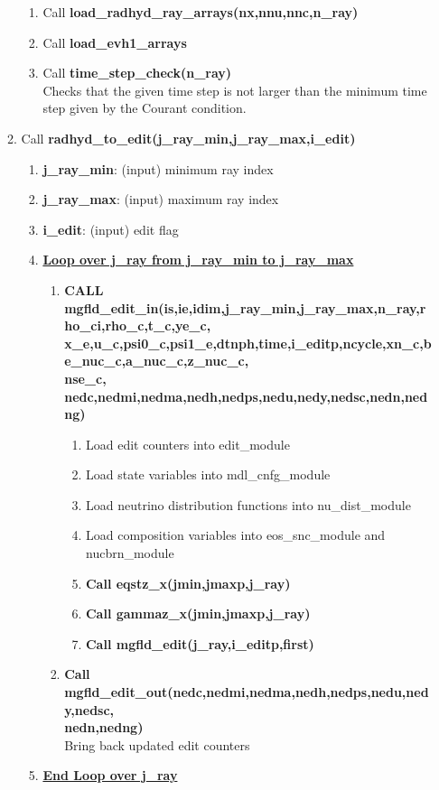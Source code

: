 \documentclass[11pt,doublespace]{article}
\begin{document}
\begin{itemize}
\begin{enumerate}
\begin{enumerate}
  \item Call {\bf load\_radhyd\_ray\_arrays(nx,nnu,nnc,n\_ray)}
  \item Call {\bf load\_evh1\_arrays}
  \item Call {\bf time\_step\_check(n\_ray)}\\
  Checks that the given time step is not larger than the minimum time step given by the Courant condition.
\end{enumerate}
  \item Call {\bf radhyd\_to\_edit(j\_ray\_min,j\_ray\_max,i\_edit)}
\begin{enumerate}
  \item {\bf j\_ray\_min}: (input) minimum ray index
  \item {\bf j\_ray\_max}: (input) maximum ray index
  \item {\bf i\_edit}: (input) edit flag
  \item {\bf {\underline{Loop over j\_ray from j\_ray\_min to j\_ray\_max}}}
\begin{enumerate}
  \item {\bf CALL mgfld\_edit\_in(is,ie,idim,j\_ray\_min,j\_ray\_max,n\_ray,rho\_ci,rho\_c,t\_c,ye\_c,\\
x\_e,u\_c,psi0\_c,psi1\_e,dtnph,time,i\_editp,ncycle,xn\_c,be\_nuc\_c,a\_nuc\_c,z\_nuc\_c,\\
nse\_c, nedc,nedmi,nedma,nedh,nedps,nedu,nedy,nedsc,nedn,nedng)}
\begin{enumerate}
  \item Load edit counters into edit\_module
  \item Load state variables into mdl\_cnfg\_module
  \item Load neutrino distribution functions into nu\_dist\_module
  \item Load composition variables into eos\_snc\_module and nucbrn\_module
  \item {\bf Call eqstz\_x(jmin,jmaxp,j\_ray)}
  \item {\bf Call gammaz\_x(jmin,jmaxp,j\_ray)}
  \item {\bf Call mgfld\_edit(j\_ray,i\_editp,first)}
\end{enumerate}
  \item {\bf Call mgfld\_edit\_out(nedc,nedmi,nedma,nedh,nedps,nedu,nedy,nedsc,\\
  nedn,nedng)}\\
  Bring back updated edit counters
\end{enumerate}
  \item {\bf {\underline{End Loop over j\_ray}}}
\end{enumerate}
\end{enumerate}
\end{itemize}
\end{document}
